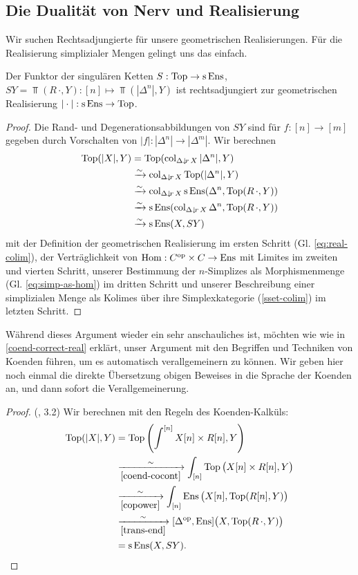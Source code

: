 \subsection{Die Dualität von Nerv und Realisierung}

Wir suchen Rechtsadjungierte für unsere geometrischen
Realisierungen. Für die Realisierung simplizialer Mengen gelingt uns
das einfach.
\begin{satz}
  Der Funktor der singulären Ketten $S: \operatorname{Top} \to \operatorname{s}\operatorname{Ens}$, $SY
  = \Top(R \, \cdot, Y): [n] \mapsto \Top(|\Delta^n|, Y)$ ist
  rechtsadjungiert zur geometrischen Realisierung
  $|\cdot|: \operatorname{s}\operatorname{Ens} \to \operatorname{Top}$.
\end{satz}
\begin{proof}
  Die Rand- und Degenerationsabbildungen von $SY$ sind für $f: [n] \to
  [m]$ gegeben durch Vorschalten von $|f|: |\Delta^n| \to
  |\Delta^m|$. Wir berechnen
  \begin{align*}
    \operatorname{Top}(|X|, Y)
    & = \operatorname{Top}(\operatorname{col}_{\Delta \downarrow \! {\scriptstyle r} \, X} |\Delta^n|, Y) \\
    & \xrightarrow[]{\sim} \operatorname{col}_{\Delta \downarrow \! {\scriptstyle r} \, X} \operatorname{Top}(|\Delta^n|, Y) \\
    & \xrightarrow[]{\sim} \operatorname{col}_{\Delta \downarrow \! {\scriptstyle r} \, X} \operatorname{s}\operatorname{Ens}(\Delta^n, \operatorname{Top}(R \, \cdot, Y)) \\
    & \xrightarrow[]{\sim} \operatorname{s}\operatorname{Ens}(\operatorname{col}_{\Delta \downarrow \! {\scriptstyle r} \, X} \Delta^n, \operatorname{Top}(R \, \cdot, Y)) \\
    & \xrightarrow[]{\sim} \operatorname{s}\operatorname{Ens}(X, SY)
  \end{align*}  
  mit der Definition der geometrischen Realisierung im ersten Schritt
  (Gl. \ref{eq:real-colim}), der Verträglichkeit von $\operatorname{Hom}:
  C^\mathrm{op} \times C \to \operatorname{Ens}$ mit Limites im zweiten und vierten Schritt,
  unserer Bestimmung der $n$-Simplizes als Morphismenmenge
  (Gl. \ref{eq:simp-as-hom}) im dritten Schritt und unserer
  Beschreibung einer simplizialen Menge als Kolimes über ihre
  Simplexkategorie (\ref{sset-colim}) im letzten Schritt.
\end{proof}
Während dieses Argument wieder ein sehr anschauliches ist, möchten wie
wie in \ref{coend-correct-real} erklärt, unser Argument mit den
Begriffen und Techniken von Koenden führen, um es automatisch
verallgemeinern zu können. Wir geben hier noch einmal die direkte
Übersetzung obigen Beweises in die Sprache der Koenden an, und dann
sofort die Verallgemeinerung.
\begin{proof} (\cite{Lore}, 3.2)
  Wir berechnen mit den Regeln des Koenden-Kalküls:
  \begin{align*}
     \operatorname{Top}(|X|, Y)
     &= \operatorname{Top} \left( \int^{[n]} X[n] \times R[n], Y \right) \\
     & \xrightarrow[\ref{coend-cocont}]{\sim}
       \int_{[n]} \operatorname{Top} \big( X[n] \times R[n], Y \big) \\
     & \xrightarrow[\ref{copower}]{\sim}
       \int_{[n]} \operatorname{Ens} \big( X[n], \operatorname{Top}(R[n], Y) \big) \\
     & \xrightarrow[\ref{trans-end}]{\sim}
       [\Delta^\mathrm{op}, \operatorname{Ens}] \big( X, \operatorname{Top}(R \, \cdot, Y) \big) \\
     &= \operatorname{s}\operatorname{Ens}(X, SY).
  \end{align*}
\end{proof}


